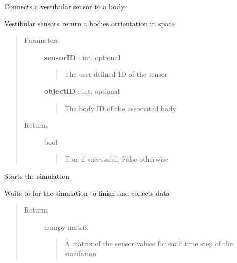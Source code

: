 \documentclass[letterpaper,10pt,english]{sphinxmanual}
\begin{document}
\begin{fulllineitems}
\begin{fulllineitems}
\label{code:pyrosim.PYROSIM.Send_Vestibular_Sensor}
Connects a vestibular sensor to a body

Vestibular sensors return a bodies orrientation in space
\begin{quote}\begin{description}
\item[{Parameters}] \leavevmode
\textbf{sensorID} : int, optional
\begin{quote}

The user defined ID of the sensor
\end{quote}

\textbf{objectID} : int, optional
\begin{quote}

The body ID of the associated body
\end{quote}

\item[{Returns}] \leavevmode
bool
\begin{quote}

True if successful, False otherwise
\end{quote}

\end{description}\end{quote}

\end{fulllineitems}


\begin{fulllineitems}
\label{code:pyrosim.PYROSIM.Start}
Starts the simulation

\end{fulllineitems}


\begin{fulllineitems}
\label{code:pyrosim.PYROSIM.Wait_To_Finish}
Waits to for the simulation to finish and collects data
\begin{quote}\begin{description}
\item[{Returns}] \leavevmode
numpy matrix
\begin{quote}

A matrix of the sensor values for each time step of the simulation
\end{quote}

\end{description}\end{quote}

\end{fulllineitems}


\end{fulllineitems}
\end{document}
